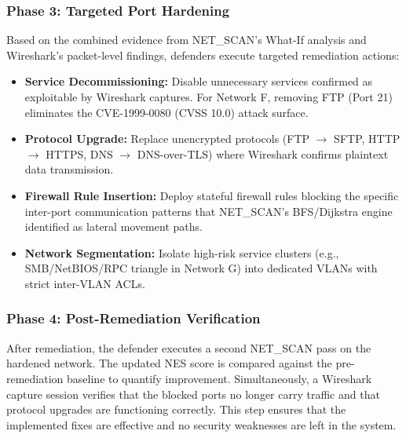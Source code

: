 \documentclass[conference]{IEEEtran}
\begin{document}
\subsubsection{Phase 3: Targeted Port Hardening}
Based on the combined evidence from NET\_SCAN's What-If analysis and Wireshark's packet-level findings, defenders execute targeted remediation actions:
\begin{itemize}
    \item \textbf{Service Decommissioning:} Disable unnecessary services confirmed as exploitable by Wireshark captures. For Network F, removing FTP (Port 21) eliminates the CVE-1999-0080 (CVSS 10.0) attack surface.
    \item \textbf{Protocol Upgrade:} Replace unencrypted protocols (FTP $\to$ SFTP, HTTP $\to$ HTTPS, DNS $\to$ DNS-over-TLS) where Wireshark confirms plaintext data transmission.
    \item \textbf{Firewall Rule Insertion:} Deploy stateful firewall rules blocking the specific inter-port communication patterns that NET\_SCAN's BFS/Dijkstra engine identified as lateral movement paths.
    \item \textbf{Network Segmentation:} Isolate high-risk service clusters (e.g., SMB/NetBIOS/RPC triangle in Network G) into dedicated VLANs with strict inter-VLAN ACLs.
\end{itemize}

\subsubsection{Phase 4: Post-Remediation Verification}
After remediation, the defender executes a second NET\_SCAN pass on the hardened network. The updated NES score is compared against the pre-remediation baseline to quantify improvement. Simultaneously, a Wireshark capture session verifies that the blocked ports no longer carry traffic and that protocol upgrades are functioning correctly. This step ensures that the implemented fixes are effective and no security weaknesses are left in the system.
\end{document}
